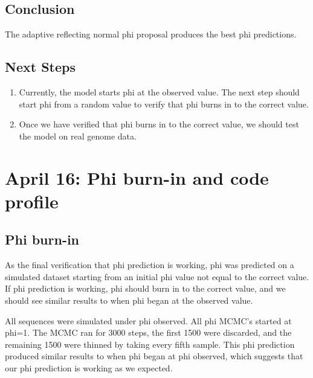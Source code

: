 \documentclass{article}
\begin{document}
 	\subsection{Conclusion}
 	
	 	The adaptive reflecting normal phi proposal produces the best phi predictions.
 	
 	\subsection{Next Steps}
 		\begin{enumerate}
 		\item Currently, the model starts phi at the observed value. The next step should start phi from a random value to verify that phi burns in to the correct value.
 		\item Once we have verified that phi burns in to the correct value, we should test the model on real genome data.
 		\end{enumerate}
 
 \newpage
 
 \section{April 16: Phi burn-in and code profile}
 
	 \subsection{Phi burn-in}
	 
		As the final verification that phi prediction is working, phi was predicted on a simulated dataset starting from an initial phi value not equal to the correct value. If phi prediction is working, phi should burn in to the correct value, and we should see similar results to when phi began at the observed value. 

		All sequences were simulated under phi observed. All phi MCMC's started at phi=1. The MCMC ran for 3000 steps, the first 1500 were discarded, and the remaining 1500 were thinned by taking every fifth sample. This phi prediction produced similar results to when phi began at phi observed, which suggests that our phi prediction is working as we expected.
		
\end{document}
